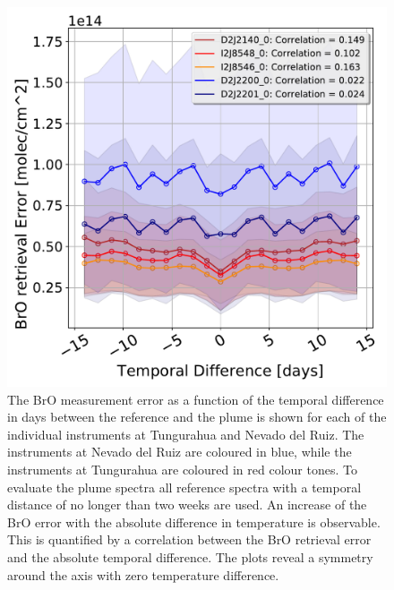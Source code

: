 \begin{figure}
	\centering
	\includegraphics[width=0.7\linewidth]{Bilder/DatallInstruments}
	\caption{The BrO measurement error as a function of the temporal difference in days between the reference and the plume is shown for each of the individual instruments at Tungurahua and Nevado del Ruiz. The instruments at Nevado del Ruiz are coloured in blue, while the instruments at Tungurahua are coloured in red colour tones.  To evaluate the plume spectra all reference spectra with a temporal distance of no longer than two weeks are used. An increase of the BrO error with the absolute difference in temperature is observable. This is quantified by a correlation between the BrO retrieval error and the absolute temporal difference. The plots reveal a symmetry around the axis with zero temperature difference.}
	\label{fig:datallinstruments}
\end{figure}




